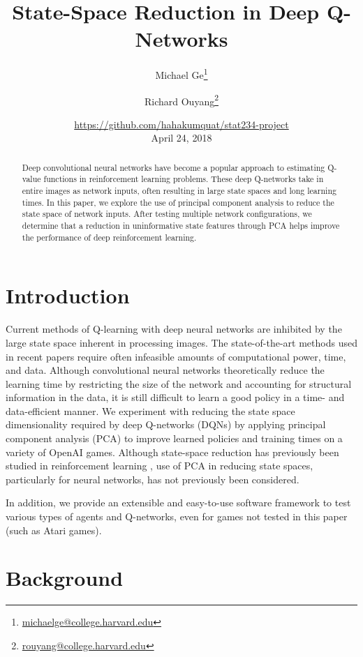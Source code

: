 \documentclass[11pt]{article}
\title{State-Space Reduction in Deep Q-Networks}
\author{Michael Ge\thanks{\url{michaelge@college.harvard.edu}} 
        \and 
        Richard Ouyang\thanks{\url{rouyang@college.harvard.edu}}}
\date{\small{\url{https://github.com/hahakumquat/stat234-project}}\\
      April 24, 2018}
\begin{document}
\maketitle

\begin{abstract}
Deep convolutional neural networks have become a popular approach to estimating Q-value functions in reinforcement learning problems. These deep Q-networks take in entire images as network inputs, often resulting in large state spaces and long learning times. In this paper, we explore the use of principal component analysis to reduce the state space of network inputs. After testing multiple network configurations, we determine that a reduction in uninformative state features through PCA helps improve the performance of deep reinforcement learning.
\end{abstract}

\newpage
\tableofcontents

\twocolumn
\newpage

\section{Introduction}

Current methods of Q-learning with deep neural networks are inhibited by the large state space inherent in processing images. The state-of-the-art methods used in recent papers \cite{mnih2013playing, mnih2015human, van2016deep} require often infeasible amounts of computational power, time, and data. Although convolutional neural networks theoretically reduce the learning time by restricting the size of the network and accounting for structural information in the data, it is still difficult to learn a good policy in a time- and data-efficient manner. We experiment with reducing the state space dimensionality required by deep Q-networks (DQNs) by applying principal component analysis (PCA) to improve learned policies and training times on a variety of O\-pen\-AI games. Although state-space reduction has previously been studied in reinforcement learning \cite{kishima2013reduction}, use of PCA in reducing state spaces, particularly for neural networks, has not previously been considered. 

In addition, we provide an extensible and easy-to-use software framework to test various types of agents and Q-networks, even for games not tested in this paper (such as Atari games).

\section{Background}
\end{document}
